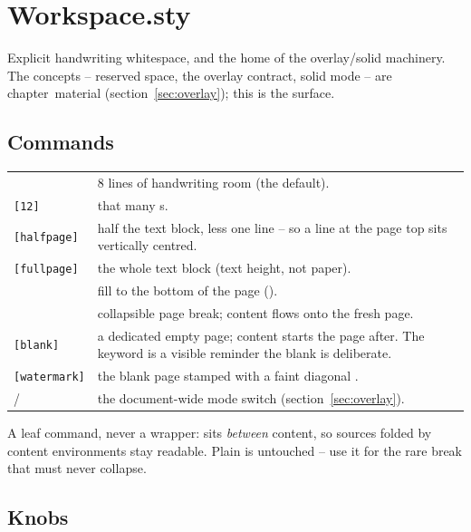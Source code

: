 \section{Workspace.sty}\label{sec:ref-workspace}

Explicit handwriting whitespace, and the home of the overlay/solid
machinery. The concepts -- reserved space, the overlay contract, solid
mode -- are chapter~material (section~\ref{sec:overlay}); this is the
surface.

\subsection*{Commands}

\begin{center}
\begin{tabularx}{\linewidth}{@{}l Y@{}}
 & 8 lines of handwriting room (the default).\\
\texttt{[12]} & that many s.\\
\texttt{[halfpage]} & half the text block, less one line --
  so a line at the page top sits vertically centred.\\
\texttt{[fullpage]} & the whole text block (text height, not
  paper).\\
 & fill to the bottom of the page ().\\
 & collapsible page break; content flows onto the fresh
  page.\\
\texttt{[blank]} & a dedicated empty page; content starts
  the page after. The keyword is a visible reminder the blank is
  deliberate.\\
\texttt{[watermark]} & the blank page stamped with a faint
  diagonal .\\
 /  & the document-wide mode switch
  (section~\ref{sec:overlay}).\\
\end{tabularx}
\end{center}

A leaf command, never a wrapper:  sits \emph{between}
content, so sources folded by content environments stay readable. Plain
 is untouched -- use it for the rare break that must never
collapse.

\subsection*{Knobs}

